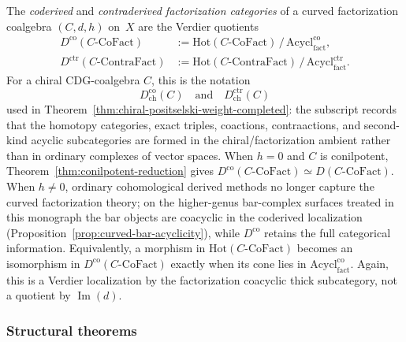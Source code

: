 \begin{definition}
\label{def:coderived-fact}
The \emph{coderived} and \emph{contraderived factorization
categories} of a curved factorization coalgebra $(C, d, h)$
on~$X$ are the Verdier quotients
\begin{align}
D^{\mathrm{co}}(C\text{-}\mathrm{CoFact})
 &:= \mathrm{Hot}(C\text{-}\mathrm{CoFact})
 \,\big/\, \mathrm{Acycl}^{\mathrm{co}}_{\mathrm{fact}},
 \label{eq:coderived-fact}\\
D^{\mathrm{ctr}}(C\text{-}\mathrm{ContraFact})
 &:= \mathrm{Hot}(C\text{-}\mathrm{ContraFact})
 \,\big/\, \mathrm{Acycl}^{\mathrm{ctr}}_{\mathrm{fact}}.
 \label{eq:contraderived-fact}
\end{align}
For a chiral CDG-coalgebra \(C\), this is the notation
\[
D^{\mathrm{co}}_{\mathrm{ch}}(C)
\quad\text{and}\quad
D^{\mathrm{ctr}}_{\mathrm{ch}}(C)
\]
used in Theorem~\ref{thm:chiral-positselski-weight-completed}: the
subscript records that the homotopy categories, exact triples,
coactions, contraactions, and second-kind acyclic subcategories are
formed in the chiral/factorization ambient rather than in ordinary
complexes of vector spaces.
When $h = 0$ and $C$ is conilpotent,
Theorem~\ref{thm:conilpotent-reduction} gives
$D^{\mathrm{co}}(C\text{-}\mathrm{CoFact})
\simeq D(C\text{-}\mathrm{CoFact})$.
When $h \neq 0$, ordinary cohomological derived methods no longer
capture the curved factorization theory; on the higher-genus
bar-complex surfaces treated in this monograph the bar objects are
coacyclic in the coderived localization
\textup{(}Proposition~\ref{prop:curved-bar-acyclicity}\textup{)},
while $D^{\mathrm{co}}$ retains the full categorical information.
Equivalently, a morphism in $\mathrm{Hot}(C\text{-}\mathrm{CoFact})$
becomes an isomorphism in
$D^{\mathrm{co}}(C\text{-}\mathrm{CoFact})$ exactly when its cone lies
in $\mathrm{Acycl}^{\mathrm{co}}_{\mathrm{fact}}$. Again, this is a
Verdier localization by the factorization coacyclic thick
subcategory, not a quotient by $\operatorname{Im}(d)$.
\end{definition}

\subsubsection*{Structural theorems}

